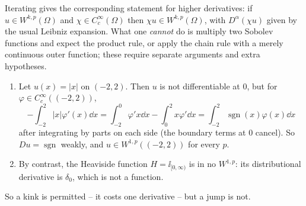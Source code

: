 \documentclass[a4paper]{scrartcl}
\DeclareMathOperator{\sgn}{sgn}
\begin{document}
Iterating gives the corresponding statement for higher derivatives: if $u \in W^{k,p}(\Omega)$ and $\chi\in C_c^\infty(\Omega)$ then $\chi u \in W^{k,p}(\Omega)$, with $D^\alpha(\chi u)$ given by the usual Leibniz expansion. What one \emph{cannot} do is multiply two Sobolev functions and expect the product rule, or apply the chain rule with a merely continuous outer function; these require separate arguments and extra hypotheses.

\begin{example}\label{ex:kink}
	\begin{enumerate}[label=(\roman*)]
		\item Let $u(x)=|x|$ on $(-2,2)$. Then $u$ is not differentiable at $0$, but for $\varphi\in C_c^\infty((-2,2))$,
		$$-\int_{-2}^2|x|\varphi'(x)\dd x = \int_{-2}^0\varphi'x\dd x-\int_0^2 x\varphi'\dd x = \int_{-2}^2\sgn(x)\varphi(x)\dd x$$
		after integrating by parts on each side (the boundary terms at $0$ cancel). So $Du=\sgn$ weakly, and $u \in W^{1,p}((-2,2))$ for every $p$.
		\item By contrast, the Heaviside function $H=\ii_{[0,\infty)}$ is in no $W^{1,p}$: its distributional derivative is $\delta_0$, which is not a function.
	\end{enumerate}
	So a kink is permitted -- it costs one derivative -- but a jump is not.
\begin{center}
\end{center}
\end{example}
\end{document}
